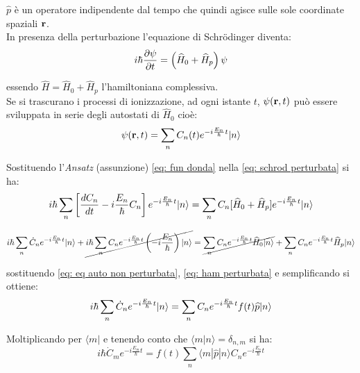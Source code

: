 $\widehat{p}$ è un operatore indipendente dal tempo che quindi agisce sulle sole coordinate spaziali $\mathbf{r}$.\\
In presenza della perturbazione l'equazione di Schr\"{o}dinger diventa:
\begin{equation} \label{eq: schrod perturbata}
    i\hbar \frac{\partial \psi}{\partial t} = \left(\widehat{H}_0 + \widehat{H}_p\right)\psi
\end{equation}

essendo $\widehat{H} = \widehat{H}_0 + \widehat{H}_p$ l'hamiltoniana complessiva.\\
Se si trascurano i processi di ionizzazione, ad ogni istante $t$, $\psi(\mathbf{r},t)$ può essere sviluppata in serie degli autostati  di $\widehat{H}_0$ cioè:
\begin{equation}\label{eq: fun donda}
    \psi(\mathbf{r},t) = \sum_n C_n(t) e^{-i\frac{E_n}{\hbar}t} |n\rangle
\end{equation}

Sostituendo l'\textit{Ansatz} (assunzione) \eqref{eq: fun donda} nella \eqref{eq: schrod perturbata} si ha:
\begin{equation*}
    i\hbar \sum_n \left[\frac{d C_n}{d t} - i\frac{E_n}{\hbar} C_n \right] e^{-i\frac{E_n}{\hbar}t} |n\rangle = \sum_n C_n [\widehat{H}_0 + \widehat{H}_p] e^{-i\frac{E_n}{\hbar}t} |n\rangle
\end{equation*}

\begin{equation*}
    i\hbar \sum_n \dot{C}_n e^{-i\frac{E_n}{\hbar}t} |n\rangle + \cancel{i\hbar \sum_n C_n e^{-i\frac{E_n}{\hbar}t} \left(-i\frac{E_n}{\hbar}\right) |n\rangle} = \cancel{\sum_n C_n e^{-i\frac{E_n}{\hbar}t} \widehat{H}_0 |n\rangle} + \sum_n C_n e^{-i\frac{E_n}{\hbar}t} \widehat{H}_p |n\rangle
\end{equation*}

sostituendo \eqref{eq: eq auto non perturbata}, \eqref{eq: ham perturbata} e semplificando si ottiene:
\begin{equation*}
    i\hbar \sum_n \dot{C}_n e^{-i\frac{E_n}{\hbar}t} |n\rangle = \sum_n C_n e^{-i\frac{E_n}{\hbar}t} f(t) \widehat{p} |n\rangle
\end{equation*}

Moltiplicando per $\langle m|$ e tenendo conto che $\langle m|n\rangle = \delta_{n,m}$ si ha:
\begin{equation*}
    i\hbar \dot{C}_m e^{-i\frac{E_m}{\hbar}t} = f(t) \sum_n \langle m|\widehat{p}|n\rangle C_n e^{-i\frac{E_n}{\hbar}t}
\end{equation*}


